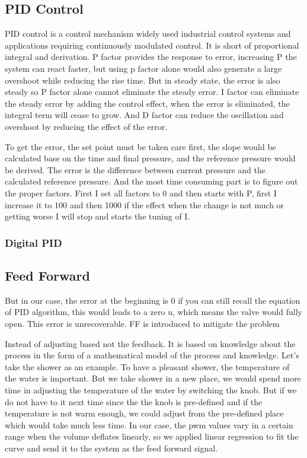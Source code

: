 \subsection{PID Control}

 PID control is a control mechanism widely used industrial control systems and applications requiring continuously modulated control. It is short of proportional integral and derivation. P factor provides the response to error, increasing P the system can react faster, but using p factor alone would also generate a large overshoot while reducing the rise time. But in steady state, the error is also steady so P factor alone cannot eliminate the steady error. I factor can eliminate the steady error by adding the control effect, when the error is eliminated, the integral term will cease to grow. And D factor can reduce the oscillation and overshoot by  reducing the effect of the error. 

 To get the error, the set point must be taken care first, the slope would be calculated base on the time and final pressure, and the reference pressure would be derived. The error is the difference between current pressure and the calculated reference pressure. And the most time consuming part is to figure out the proper factors. First I set all factors to 0 and then starts with P, first I increase it to 100 and then 1000 if the effect when the change is not much or getting worse I will stop and starts the tuning of I.

 \subsubsection{Digital PID}
 
\subsection{Feed Forward}

But in our case, the error at the beginning is 0 if you can still recall the equation of PID algorithm, this would leads to a zero u, which means the valve would fully open. This error is unrecoverable. FF is introduced to mitigate the problem

Instead of adjusting based not the feedback. It is based on knowledge about the process in the form of a mathematical model of the process and knowledge. Let's take the shower as an example. To have a pleasant shower, the temperature of the water is important. But we take shower in a new place, we would spend more time in adjusting the temperature of the water by switching the knob. But if we do not have to it next time since the the knob is pre-defined and if the temperature is not warm enough, we could adjust from the pre-defined place which would take much less time. In our case, the pwm values vary in a certain range when the volume deflates linearly, so we applied linear regression to fit the curve and send it to the system as the feed forward signal.  

